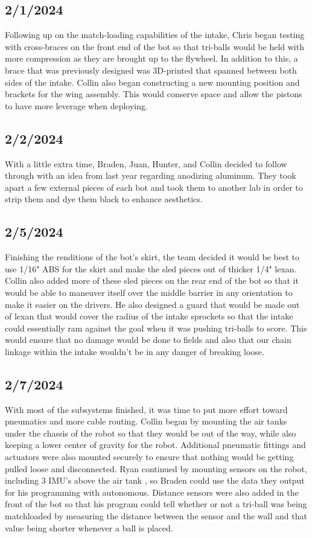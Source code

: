  \subsection{2/1/2024}
Following up on the match-loading capabilities of the intake, Chris began testing with cross-braces on the 
front end of the bot so that tri-balls would be held with more compression as they are brought up to the flywheel. In addition to this, a brace that was previously designed was 3D-printed that spanned between both sides of the intake.
Collin also began constructing a new mounting position and brackets for the wing assembly. This would conserve space and allow the pistons to have more leverage when deploying.  
\subsection{2/2/2024}
With a little extra time, Braden, Juan, Hunter, and Collin decided to follow through with an idea from last year regarding anodizing aluminum.
 They took apart a few external pieces of each bot and took them to another lab in order to strip them and dye them black to enhance aesthetics. 
\subsection{2/5/2024}
Finishing the renditions of the bot's skirt, the team decided it would be best to use 1/16" ABS for the skirt and make the sled pieces out of thicker 1/4" lexan. Collin also added more of these sled 
pieces on the rear end of the bot so that it would be able to maneuver itself over the middle barrier in any orientation to make it easier on the drivers. He also designed a guard that would be made out of lexan that would cover the radius of the intake
 sprockets so that the intake could essentially ram against the goal when it was pushing tri-balls to score. This would ensure that no damage would be done to fields and also 
 that our chain linkage within the intake wouldn't be in any danger of breaking loose.
 \subsection{2/7/2024}
 With most of the subsystems finished, it was time to put more effort toward pneumatics and more cable routing.
 Collin began by mounting the air tanks under the chassis of the robot so that they would be out of the way, while also keeping a lower center of gravity for the robot.
 Additional pneumatic fittings and actuators were also mounted securely to ensure that nothing would be getting pulled loose and disconnected. Ryan continued by mounting sensors on the robot, including 3 IMU's above the air tank
, so Braden could use the data they output for his programming with autonomous. Distance sensors were also added in the front of the bot so that his program could tell whether or not a tri-ball was being matchloaded by 
measuring the distance between the sensor and the wall and that value being shorter whenever a ball is placed.
